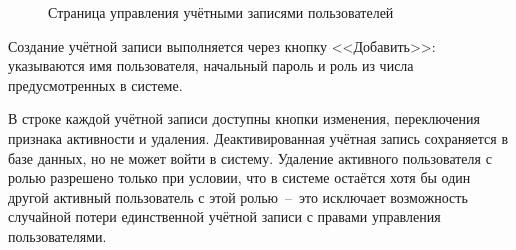 \begin{figure}[htbp]
\centering
{}
\caption{Страница управления учётными записями пользователей}
\label{fig:users}
\end{figure}

Создание учётной записи выполняется через кнопку <<Добавить>>: указываются имя пользователя, начальный пароль и роль из числа предусмотренных в системе.

В строке каждой учётной записи доступны кнопки изменения, переключения признака активности и удаления.
Деактивированная учётная запись сохраняется в базе данных, но не может войти в систему.
Удаление активного пользователя с ролью  разрешено только при условии, что в системе остаётся хотя бы один другой активный пользователь с этой ролью~--~это исключает возможность случайной потери единственной учётной записи с правами управления пользователями.
